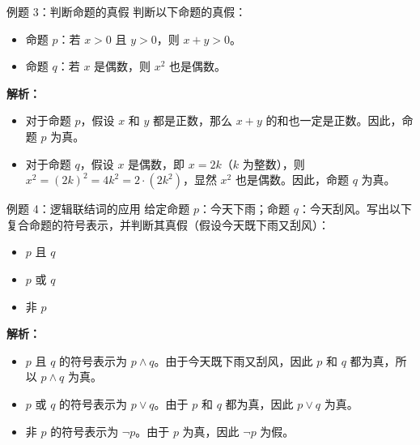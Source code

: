 \documentclass[aspectratio=169]{ctexbeamer} %
\begin{document}
\begin{frame}{例题 3：判断命题的真假}
判断以下命题的真假：
\begin{itemize}
    \item 命题 \(p\)：若 \(x > 0\) 且 \(y > 0\)，则 \(x + y > 0\)。
    \item 命题 \(q\)：若 \(x\) 是偶数，则 \(x^2\) 也是偶数。
\end{itemize}
\pause
\textbf{解析：}
\begin{itemize}
    \item 对于命题 \(p\)，假设 \(x\) 和 \(y\) 都是正数，那么 \(x + y\) 的和也一定是正数。因此，命题 \(p\) 为真。
    \item 对于命题 \(q\)，假设 \(x\) 是偶数，即 \(x = 2k\)（\(k\) 为整数），则 \(x^2 = (2k)^2 = 4k^2 = 2 \cdot (2k^2)\)，显然 \(x^2\) 也是偶数。因此，命题 \(q\) 为真。
\end{itemize}
\end{frame}

\begin{frame}{例题 4：逻辑联结词的应用}
给定命题 \(p\)：今天下雨；命题 \(q\)：今天刮风。写出以下复合命题的符号表示，并判断其真假（假设今天既下雨又刮风）：
\begin{itemize}
    \item \(p\) 且 \(q\)
    \item \(p\) 或 \(q\)
    \item 非 \(p\)
\end{itemize}
\pause
\textbf{解析：}
\begin{itemize}
    \item \(p\) 且 \(q\) 的符号表示为 \(p \land q\)。由于今天既下雨又刮风，因此 \(p\) 和 \(q\) 都为真，所以 \(p \land q\) 为真。
    \item \(p\) 或 \(q\) 的符号表示为 \(p \lor q\)。由于 \(p\) 和 \(q\) 都为真，因此 \(p \lor q\) 为真。
    \item 非 \(p\) 的符号表示为 \(\neg p\)。由于 \(p\) 为真，因此 \(\neg p\) 为假。
\end{itemize}
\end{frame}
\end{document}
